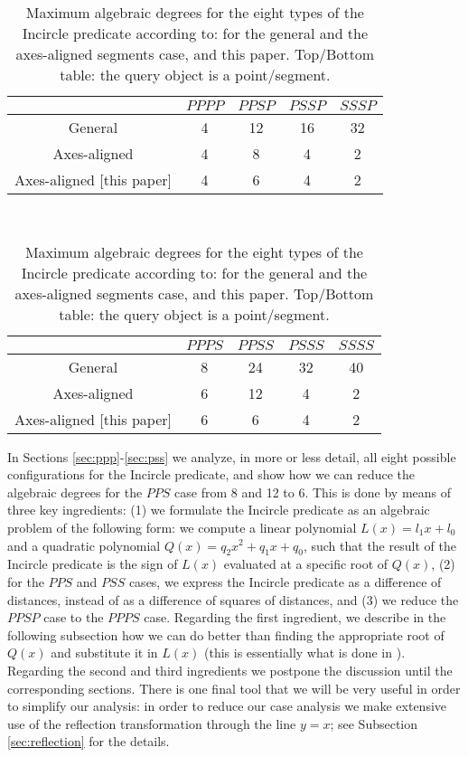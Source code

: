 \documentclass[letterpaper,11pt]{article}
\newcommand{\incircle}{\textsf{Incircle}\xspace}
\newcommand{\pps}{$PPS$\xspace}
\newcommand{\pss}{$PSS$\xspace}
\newcommand{\pppp}{$PPPP$\xspace}
\newcommand{\ppsp}{$PPSP$\xspace}
\newcommand{\pssp}{$PSSP$\xspace}
\newcommand{\sssp}{$SSSP$\xspace}
\newcommand{\ppps}{$PPPS$\xspace}
\newcommand{\ppss}{$PPSS$\xspace}
\newcommand{\psss}{$PSSS$\xspace}
\newcommand{\ssss}{$SSSS$\xspace}
\begin{document}
\begin{table}[t]
  \begin{center}
    \begin{tabular}{|c|c|c|c|c|}\hline
      &\pppp & \ppsp & \pssp & \sssp
      \\\hline\hline
      General \cite{b-ecvdl-96}&4&12&16&32\\
      Axes-aligned \cite{b-ecvdl-96}&4&8&4&2\\
      Axes-aligned [this paper]&4&6&4&2\\\hline
    \end{tabular}\\[5pt]
    \begin{tabular}{|c|c|c|c|c|}\hline
      &\ppps & \ppss & \psss & \ssss
      \\\hline\hline
      General \cite{b-ecvdl-96}&8&24&32&40\\
      Axes-aligned \cite{b-ecvdl-96}&6&12&4&2\\
      Axes-aligned [this paper]&6&6&4&2\\\hline
    \end{tabular}
  \end{center}
  \caption{Maximum algebraic degrees for the eight types of the
    \incircle predicate according to: \cite{b-ecvdl-96} for the general
    and the axes-aligned segments case, and
    this paper. Top/Bottom table: the query object is a
    point/segment.}
  \label{tbl:algdeg}
\end{table}


In Sections \ref{sec:ppp}-\ref{sec:pss} we analyze, in more or less detail,
all eight possible configurations for the \incircle predicate, and
show how we can reduce the algebraic degrees for the \pps case from 8
and 12 to 6. This is done by means of three key ingredients:
(1) we formulate the \incircle predicate as an algebraic problem of
the following form: we compute a linear polynomial $L(x)=l_1x+l_0$ and
a quadratic polynomial $Q(x)=q_2x^2+q_1x+q_0$, such that the result of
the \incircle predicate is the sign of $L(x)$ evaluated at a specific
root of $Q(x)$,
(2) for the \pps and \pss cases, we express the \incircle
predicate as a difference of distances, instead of as a difference of
squares of distances, and
(3) we reduce the \ppsp case to the \ppps case.
Regarding the first ingredient, we describe in the following
subsection how we can do better than finding the appropriate root of
$Q(x)$ and substitute it in $L(x)$ (this is essentially what is done
in \cite{b-ecvdl-96}). Regarding the second and third ingredients we
postpone the discussion until the corresponding sections.
There is one final tool that we will be very useful in order to
simplify our analysis: in order to reduce our case analysis we make
extensive use of the reflection transformation through the line
$y=x$; see Subsection \ref{sec:reflection} for the details.
\end{document}

